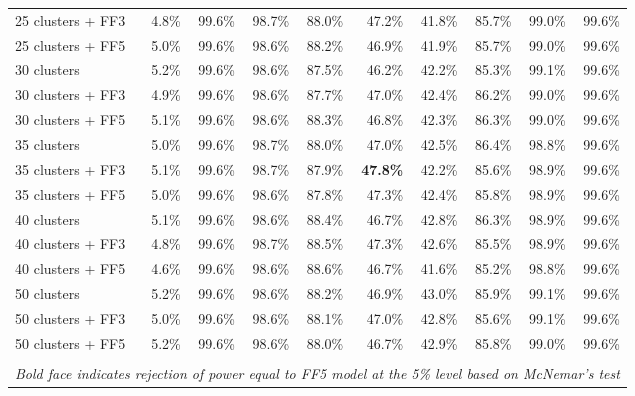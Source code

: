 \begin{table}[!h]
\begin{center}
\begin{tabular}{lrrrrrrrrr}
25 clusters + FF3	& 4.8\% & 99.6\% & 98.7\% & 88.0\% & 47.2\% & 41.8\% & 85.7\% & 99.0\% & 99.6\% \\
25 clusters + FF5	& 5.0\% & 99.6\% & 98.6\% & 88.2\% & 46.9\% & 41.9\% & 85.7\% & 99.0\% & 99.6\% \\
30 clusters	& 5.2\% & 99.6\% & 98.6\% & 87.5\% & 46.2\% & 42.2\% & 85.3\% & 99.1\% & 99.6\% \\
30 clusters + FF3	& 4.9\% & 99.6\% & 98.6\% & 87.7\% & 47.0\% & 42.4\% & 86.2\% & 99.0\% & 99.6\% \\
30 clusters + FF5	& 5.1\% & 99.6\% & 98.6\% & 88.3\% & 46.8\% & 42.3\% & 86.3\% & 99.0\% & 99.6\% \\
35 clusters	& 5.0\% & 99.6\% & 98.7\% & 88.0\% & 47.0\% & 42.5\% & 86.4\% & 98.8\% & 99.6\% \\
35 clusters + FF3	& 5.1\% & 99.6\% & 98.7\% & 87.9\% & \textbf{47.8\%} & 42.2\% & 85.6\% & 98.9\% & 99.6\% \\
35 clusters + FF5	& 5.0\% & 99.6\% & 98.6\% & 87.8\% & 47.3\% & 42.4\% & 85.8\% & 98.9\% & 99.6\% \\
40 clusters	& 5.1\% & 99.6\% & 98.6\% & 88.4\% & 46.7\% & 42.8\% & 86.3\% & 98.9\% & 99.6\% \\
40 clusters + FF3	& 4.8\% & 99.6\% & 98.7\% & 88.5\% & 47.3\% & 42.6\% & 85.5\% & 98.9\% & 99.6\% \\
40 clusters + FF5	& 4.6\% & 99.6\% & 98.6\% & 88.6\% & 46.7\% & 41.6\% & 85.2\% & 98.8\% & 99.6\% \\
50 clusters	& 5.2\% & 99.6\% & 98.6\% & 88.2\% & 46.9\% & 43.0\% & 85.9\% & 99.1\% & 99.6\% \\
50 clusters + FF3	& 5.0\% & 99.6\% & 98.6\% & 88.1\% & 47.0\% & 42.8\% & 85.6\% & 99.1\% & 99.6\% \\
50 clusters + FF5	& 5.2\% & 99.6\% & 98.6\% & 88.0\% & 46.7\% & 42.9\% & 85.8\% & 99.0\% & 99.6\% \\
\hline\\
\multicolumn{10}{l}{\itshape Bold face indicates rejection of power equal to FF5 model at the 5\% level based on McNemar's test}
    \end{tabular}
    \end{center}
\end{table}
